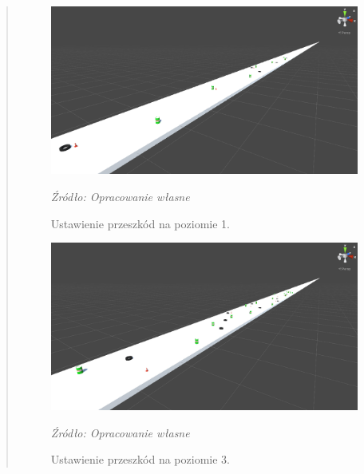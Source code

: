 \begin{quotation}
\begin{figure}[!hbt]
\centering
  \includegraphics[width=1\linewidth]{scena1.png}
  \caption{Ustawienie przeszkód na poziomie 1.}\label{rys_16}
  \begin{minipage}[t]{0.75\linewidth}
    \emph{Źródło: Opracowanie własne}
  \end{minipage}
\end{figure}

\newpage
\begin{figure}[!hbt]
\centering
  \includegraphics[width=1\linewidth]{scena3.png}
  \caption{Ustawienie przeszkód na poziomie 3.}\label{rys_17}
  \begin{minipage}[t]{0.75\linewidth}
    \emph{Źródło: Opracowanie własne}
  \end{minipage}
\end{figure}


\end{quotation}
